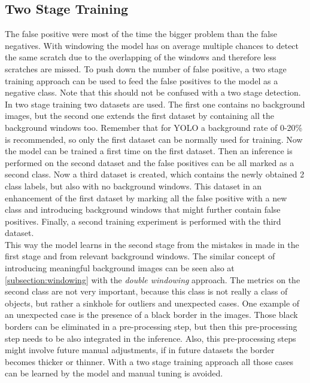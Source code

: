 \subsection{Two Stage Training}
The false positive were most of the time the bigger problem than the false negatives. With windowing the model has on average multiple chances to detect the same scratch due to the overlapping of the windows and therefore less scratches are missed. To push down the number of false positive, a two stage training approach can be used to feed the false positives to the model as a negative class. Note that this should not be confused with a two stage detection. \\
In two stage training two datasets are used. The first one contains no background images, but the second one extends the first dataset by containing all the background windows too. Remember that for YOLO a background rate of 0-20\% is recommended, so only the first dataset can be normally used for training. Now the model can be trained a first time on the first dataset. Then an inference is performed on the second dataset and the false positives can be all marked as a second class. Now a third dataset is created, which contains the newly obtained 2 class labels, but also with no background windows. This dataset in an enhancement of the first dataset by marking all the false positive with a new class and introducing background windows that might further contain false positives. Finally, a second training experiment is performed with the third dataset. \\
This way the model learns in the second stage from the mistakes in made in the first stage and from relevant background windows. The similar concept of introducing meaningful background images can be seen also at \ref{subsection:windowing} with the \textit{double windowing} approach. The metrics on the second class are not very important, because this class is not really a class of objects, but rather a sinkhole for outliers and unexpected cases. One example of an unexpected case is the presence of a black border in the images. Those black borders can be eliminated in a pre-processing step, but then this pre-processing step needs to be also integrated in the inference. Also, this pre-processing steps might involve future manual adjustments, if in future datasets the border becomes thicker or thinner. With a two stage training approach all those cases can be learned by the model and manual tuning is avoided.\\
